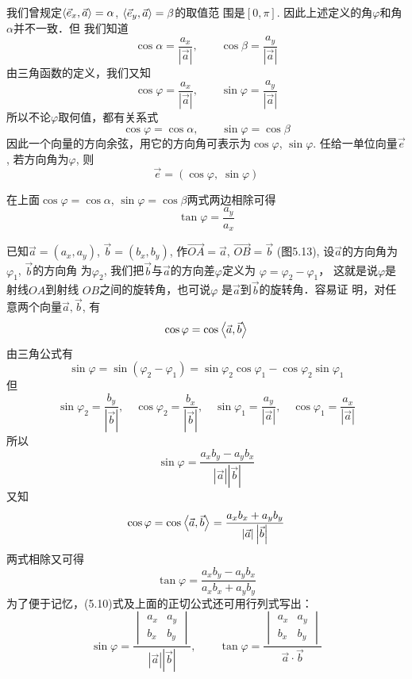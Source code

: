 我们曾规定$\left\langle \vec{e}_x,\vec{a} \right\rangle=\alpha$, $\left\langle \vec{e}_y,\vec{a} \right\rangle=\beta$的取值范
围是$[0,\pi]$. 因此上述定义的角$\varphi$和角$\alpha$并不一致．但
我们知道
\[\cos\alpha=\frac{a_x}{|\vec{a}|},\qquad \cos\beta=\frac{a_y}{|\vec{a}|}\]
由三角函数的定义，我们又知
\[\cos\varphi=\frac{a_x}{|\vec{a}|},\qquad \sin\varphi=\frac{a_y}{|\vec{a}|}\]
所以不论$\varphi$取何值，都有关系式
\[\cos\varphi=\cos\alpha,\qquad \sin\varphi=\cos\beta\]
因此一个向量的方向余弦，用它的方向角可表示为$\cos\varphi$, $
\sin\varphi$. 任给一单位向量$\vec{e}$, 若方向角为$\varphi$, 则
\[\vec{e}=(\cos\varphi,\; \sin\varphi)\]

在上面$\cos\varphi=\cos\alpha$, $\sin\varphi=\cos\beta$两式两边相除可得
\[\tan \varphi =\frac{a_y}{a_x}\]

\begin{figure}[htp]
    \centering
{}
    \caption{}
\end{figure}


已知$\vec{a}=(a_x,a_y)$, $\vec{b}=(b_x,b_y)$, 作$\Vec{OA}=\vec{a}$, $\Vec{OB}=\vec{b}$ (图5.13), 设$\vec{a}$的方向角为$\varphi_1$, $\vec{b}$的方向角
为$\varphi_2$, 我们把$\vec{b}$与$\vec{a}$的方向差$\varphi$定义为
$\varphi=\varphi_2-\varphi_1$，
这就是说$\varphi$是射线$OA$到射线
$OB$之间的旋转角，也可说$\varphi$ 
是$\vec{a}$到$\vec{b}$的旋转角．容易证
明，对任意两个向量$\vec{a},\vec{b}$, 
有
\[\cos\varphi =\cos\left\langle \vec{a},\vec{b} \right\rangle\]
由三角公式有
\[\sin\varphi  =\sin(\varphi_2-\varphi_1 ) = \sin\varphi_2\cos\varphi_1 -\cos\varphi_2\sin\varphi_1\]
但
\[\sin\varphi_2=\frac{b_y}{|\vec{b}|},\quad \cos\varphi_2=\frac{b_x}{|\vec{b}|},\quad \sin\varphi_1=\frac{a_y}{|\vec{a}|},\quad \cos\varphi_1=\frac{a_x}{|\vec{a}|}\]
所以
\begin{equation}
    \sin\varphi=\frac{a_xb_y-a_yb_x}{|\vec{a}|\left|\vec{b}\right|}
\end{equation}
又知
\[\cos\varphi =\cos\left\langle \vec{a},\vec{b} \right\rangle=\dfrac{a_xb_x+a_yb_y}{|\vec{a}|\left|\vec{b}\right|}\]
两式相除又可得
\[\tan\varphi =\frac{a_xb_y-a_yb_x}{a_xb_x+a_yb_y}\]
为了便于记忆，(5.10)式及上面的正切公式还可用行列式写出：
\[\sin\varphi=\frac{\begin{vmatrix}
    a_x& a_y\\b_x&b_y
\end{vmatrix}}{|\vec{a}|\left|\vec{b}\right|},\qquad \tan\varphi=\frac{\begin{vmatrix}
    a_x& a_y\\b_x&b_y
\end{vmatrix}}{\vec{a}\cdot \vec{b}}\]


